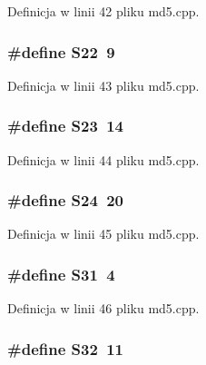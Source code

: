 Definicja w linii 42 pliku md5.cpp.\hypertarget{a00009_ddad30455da936bc1879ee9c72b46d59}{
\subsubsection[{S22}]{\setlength{\rightskip}{0pt plus 5cm}\#define S22~9}}
\label{a00009_ddad30455da936bc1879ee9c72b46d59}




Definicja w linii 43 pliku md5.cpp.\hypertarget{a00009_6321a8b29628936f76e9e78cf5bda95f}{
\subsubsection[{S23}]{\setlength{\rightskip}{0pt plus 5cm}\#define S23~14}}
\label{a00009_6321a8b29628936f76e9e78cf5bda95f}




Definicja w linii 44 pliku md5.cpp.\hypertarget{a00009_0c09eb77d30a0d5f9154914147b86c20}{
\subsubsection[{S24}]{\setlength{\rightskip}{0pt plus 5cm}\#define S24~20}}
\label{a00009_0c09eb77d30a0d5f9154914147b86c20}




Definicja w linii 45 pliku md5.cpp.\hypertarget{a00009_ef26590f8a880ee6f4a158168defcd89}{
\subsubsection[{S31}]{\setlength{\rightskip}{0pt plus 5cm}\#define S31~4}}
\label{a00009_ef26590f8a880ee6f4a158168defcd89}




Definicja w linii 46 pliku md5.cpp.\hypertarget{a00009_1d512424dd8a91e0a5bcc98563f33914}{
\subsubsection[{S32}]{\setlength{\rightskip}{0pt plus 5cm}\#define S32~11}}
\label{a00009_1d512424dd8a91e0a5bcc98563f33914}




